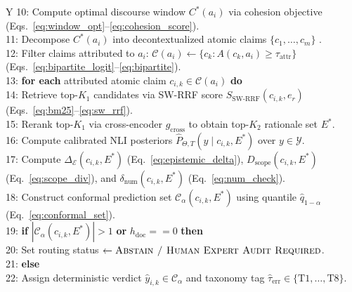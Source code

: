 \documentclass[sigconf]{acmart}
\begin{document}
\begin{table}[t]
\begin{tabularx}{\columnwidth}{Y}
10: \hspace{0.5em} Compute optimal discourse window $C^*(a_i)$ via cohesion objective (Eqs.~\ref{eq:window_opt}--\ref{eq:cohesion_score}). \\
11: \hspace{0.5em} Decompose $C^*(a_i)$ into decontextualized atomic claims $\{c_1, \dots, c_m\}$ \cite{kamoi2023wice,min2023factscore}. \\
12: \hspace{0.5em} Filter claims attributed to $a_i$: $\mathcal{C}(a_i) \leftarrow \{c_k : A(c_k, a_i) \geq \tau_{\text{attr}}\}$ (Eqs.~\ref{eq:bipartite_logit}--\ref{eq:bipartite}). \\
13: \hspace{0.5em} \textbf{for each} attributed atomic claim $c_{i,k} \in \mathcal{C}(a_i)$ \textbf{do} \\
14: \hspace{1.3em} Retrieve top-$K_1$ candidates via SW-RRF score $S_{\text{SW-RRF}}(c_{i,k}, e_r)$ (Eqs.~\ref{eq:bm25}--\ref{eq:sw_rrf}). \\
15: \hspace{1.3em} Rerank top-$K_1$ via cross-encoder $g_{\text{cross}}$ to obtain top-$K_2$ rationale set $E^*$. \\
16: \hspace{1.3em} Compute calibrated NLI posteriors $\hat{P}_{\Theta, T}(y \mid c_{i,k}, E^*)$ over $y \in \mathcal{Y}$. \\
17: \hspace{1.3em} Compute $\Delta_{\mathcal{E}}(c_{i,k}, E^*)$ (Eq.~\ref{eq:epistemic_delta}), $D_{\text{scope}}(c_{i,k}, E^*)$ (Eq.~\ref{eq:scope_div}), and $\delta_{\text{num}}(c_{i,k}, E^*)$ (Eq.~\ref{eq:num_check}). \\
18: \hspace{1.3em} Construct conformal prediction set $\mathcal{C}_{\alpha}(c_{i,k}, E^*)$ using quantile $\hat{q}_{1-\alpha}$ (Eq.~\ref{eq:conformal_set}). \\
19: \hspace{1.3em} \textbf{if} $|\mathcal{C}_{\alpha}(c_{i,k}, E^*)| > 1$ \textbf{or} $h_{\text{doc}} == 0$ \textbf{then} \\
20: \hspace{2.1em} Set routing status $\leftarrow \textsc{Abstain / Human Expert Audit Required}$. \\
21: \hspace{1.3em} \textbf{else} \\
22: \hspace{2.1em} Assign deterministic verdict $\hat{y}_{i,k} \in \mathcal{C}_{\alpha}$ and taxonomy tag $\hat{\tau}_{\text{err}} \in \{\text{T1}, \dots, \text{T8}\}$. \\

\end{tabularx}
\end{table}
\end{document}
